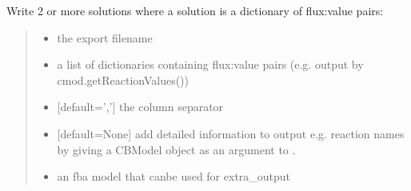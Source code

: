 \documentclass[letterpaper,12pt,english]{sphinxmanual}
\begin{document}
\begin{fulllineitems}

\pysigstartsignatures
\pysiglinewithargsret
{}
{\sphinxparamcomma {}\sphinxparamcomma {}\sphinxparamcomma {}\sphinxparamcomma {}}
{}
\pysigstopsignatures
\sphinxAtStartPar
Write 2 or more solutions where a solution is a dictionary of flux:value pairs:
\begin{quote}\begin{description}
\begin{itemize}
\item {} 
\sphinxAtStartPar
{} \textendash{} the export filename

\item {} 
\sphinxAtStartPar
{} \textendash{} a list of dictionaries containing flux:value pairs (e.g. output by cmod.getReactionValues())

\item {} 
\sphinxAtStartPar
{} \textendash{} {[}default=’,’{]} the column separator

\item {} 
\sphinxAtStartPar
{} \textendash{} {[}default=None{]} add detailed information to output e.g. reaction names by giving a CBModel object as an argument to .

\item {} 
\sphinxAtStartPar
{} \textendash{} an fba model that canbe used for extra\_output

\end{itemize}

\end{description}\end{quote}

\end{fulllineitems}
\end{document}
